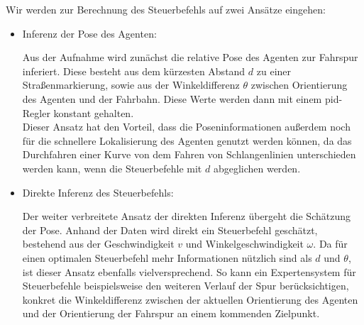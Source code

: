 Wir werden zur Berechnung des Steuerbefehls auf zwei Ansätze eingehen:

\begin{itemize}
	\item Inferenz der Pose des Agenten: \\ 
	\vspace{-0.6cm}
	
	Aus der Aufnahme wird zunächst die relative Pose des Agenten zur Fahrspur inferiert. Diese besteht aus dem kürzesten Abstand $d$ zu einer Straßenmarkierung, sowie aus der Winkeldifferenz $\theta$ zwischen Orientierung des Agenten und der Fahrbahn. Diese Werte werden dann mit einem \acs{pid}-Regler konstant gehalten.\\
	Dieser Ansatz hat den Vorteil, dass die Poseninformationen außerdem noch für die schnellere Lokalisierung des Agenten genutzt werden können, da das Durchfahren einer Kurve von dem Fahren von Schlangenlinien unterschieden werden kann, wenn die Steuerbefehle mit $d$ abgeglichen werden.
	
	\item Direkte Inferenz des Steuerbefehls: \\ 
	\vspace{-0.6cm}
	
	Der weiter verbreitete Ansatz der direkten Inferenz übergeht die Schätzung der Pose. Anhand der Daten wird direkt ein Steuerbefehl geschätzt, bestehend aus der Geschwindigkeit $v$ und Winkelgeschwindigkeit $\omega$. Da für einen optimalen Steuerbefehl mehr Informationen nützlich sind als $d$ und $\theta$, ist dieser Ansatz ebenfalls vielversprechend. So kann ein Expertensystem für Steuerbefehle beispielsweise den weiteren Verlauf der Spur berücksichtigen, konkret die Winkeldifferenz zwischen der aktuellen Orientierung des Agenten und der Orientierung der Fahrspur an einem kommenden Zielpunkt.
\end{itemize}
